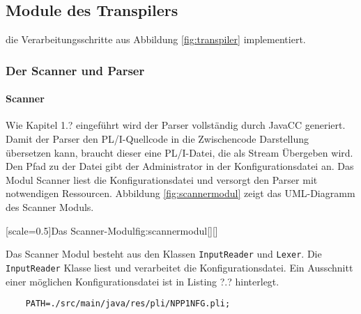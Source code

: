 
\subsection{Module des Transpilers}
die Verarbeitungsschritte aus Abbildung \ref{fig:transpiler} implementiert.

\subsubsection{Der Scanner und Parser}
\paragraph{Scanner}
Wie Kapitel 1.? eingeführt wird der Parser vollständig durch JavaCC generiert.
Damit der Parser den PL/I-Quellcode in die Zwischencode Darstellung übersetzen kann,
braucht dieser eine PL/I-Datei, die als Stream Übergeben wird.
Den Pfad zu der Datei gibt der Administrator in der Konfigurationsdatei an.
Das Modul Scanner liest die Konfigurationsdatei und versorgt den Parser mit notwendigen Ressourcen.
Abbildung \ref{fig:scannermodul} zeigt das UML-Diagramm des Scanner Moduls.

[scale=0.5]{Das Scanner-Modul}{fig:scannermodul}[][]

Das Scanner Modul besteht aus den Klassen \verb+InputReader+ und \verb+Lexer+. 
Die \verb+InputReader+ Klasse liest und verarbeitet die Konfigurationsdatei. Ein Ausschnitt einer möglichen Konfigurationsdatei ist in Listing ?.? hinterlegt.

\begin{verbatim}
	PATH=./src/main/java/res/pli/NPP1NFG.pli;
\end{verbatim}

